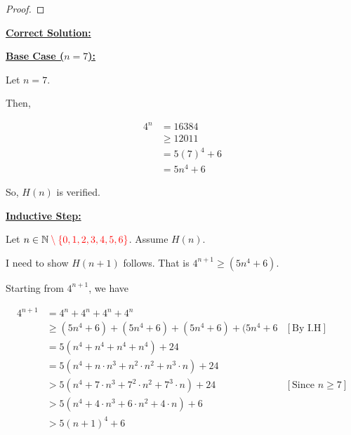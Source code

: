 \documentclass[12pt]{article}
\begin{document}
\begin{itemize}
\begin{proof}
    \end{proof}

    \bigskip

    \begin{mdframed}
        \underline{\textbf{Correct Solution:}}

        \bigskip

        \underline{\textbf{Base Case ($n = 7$):}}

        \bigskip

        Let $n = 7$.

        \bigskip

        Then,

        \begin{align}
            4^n &= 16384\\
            &\geq 12011\\
            &= 5(7)^4 + 6\\
            &= 5n^4 + 6
        \end{align}

        \bigskip

        So, $H(n)$ is verified.

        \bigskip

        \underline{\textbf{Inductive Step:}}

        \bigskip

        Let $n \in \mathbb{N} \color{red}\setminus \{0,1,2,3,4,5,6\}\color{black}$. Assume $H(n)$.

        \bigskip

        I need to show $H(n+1)$ follows. That is $4^{n+1} \geq (5n^4 + 6)$.

        \bigskip

        Starting from $4^{n+1}$, we have

        \begin{align}
            4^{n+1} &= 4^n + 4^n + 4^n + 4^n\\
            &\geq (5n^4 + 6) + (5n^4 + 6) + (5n^4 + 6) + (5n^4 + 6 & [\text{By I.H}]\\
            &= 5(n^4 + n^4 + n^4 + n^4) + 24\\
            &= 5(n^4 + n \cdot n^3 + n^2 \cdot n^2 + n^3 \cdot n) + 24\\
            &> 5(n^4 + 7 \cdot n^3 + 7^2 \cdot n^2 + 7^3 \cdot n) + 24 & [\text{Since $n \geq 7$}]\\
            &> 5(n^4 + 4 \cdot n^3 + 6 \cdot n^2 + 4 \cdot n) + 6\\
            &> 5(n+1)^4 + 6
        \end{align}


\end{mdframed}
\end{itemize}
\end{document}

